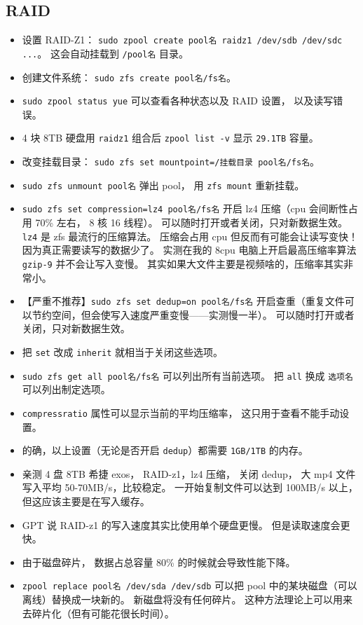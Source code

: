 \subsection{RAID}
\begin{itemize}
\item 设置 RAID-Z1： \verb|sudo zpool create pool名 raidz1 /dev/sdb /dev/sdc ...|。 这会自动挂载到 \verb|/pool名| 目录。
\item 创建文件系统： \verb|sudo zfs create pool名/fs名|。
\item \verb|sudo zpool status yue| 可以查看各种状态以及 RAID 设置， 以及读写错误。
\item 4 块 8TB 硬盘用 \verb|raidz1| 组合后 \verb|zpool list -v| 显示 \verb|29.1TB| 容量。
\item 改变挂载目录： \verb|sudo zfs set mountpoint=/挂载目录 pool名/fs名|。
\item \verb|sudo zfs unmount pool名| 弹出 pool， 用 \verb|zfs mount| 重新挂载。
\item \verb|sudo zfs set compression=lz4 pool名/fs名| 开启 lz4 压缩（cpu 会间断性占用 70\% 左右， 8 核 16 线程）。 可以随时打开或者关闭，只对新数据生效。 \verb|lz4| 是 zfs 最流行的压缩算法。 压缩会占用 cpu 但反而有可能会让读写变快！ 因为真正需要读写的数据少了。 实测在我的 8cpu 电脑上开启最高压缩率算法 \verb|gzip-9| 并不会让写入变慢。 其实如果大文件主要是视频啥的，压缩率其实非常小。
\item 【严重不推荐】\verb|sudo zfs set dedup=on pool名/fs名| 开启查重（重复文件可以节约空间，但会使写入速度严重变慢——实测慢一半）。 可以随时打开或者关闭，只对新数据生效。
\item 把 \verb|set| 改成 \verb|inherit| 就相当于关闭这些选项。
\item \verb|sudo zfs get all pool名/fs名| 可以列出所有当前选项。 把 \verb|all| 换成 \verb|选项名| 可以列出制定选项。
\item \verb|compressratio| 属性可以显示当前的平均压缩率， 这只用于查看不能手动设置。
\item 的确，以上设置（无论是否开启 \verb|dedup|）都需要 \verb|1GB/1TB| 的内存。
\item 亲测 4 盘 8TB 希捷 exos， RAID-z1，lz4 压缩， 关闭 dedup， 大 mp4 文件写入平均 50-70MB/s，比较稳定。 一开始复制文件可以达到 100MB/s 以上，但这应该主要是在写入缓存。
\item GPT 说 RAID-z1 的写入速度其实比使用单个硬盘更慢。 但是读取速度会更快。
\item 由于磁盘碎片， 数据占总容量 80\% 的时候就会导致性能下降。
\item \verb|zpool replace pool名 /dev/sda /dev/sdb| 可以把 pool 中的某块磁盘（可以离线）替换成一块新的。 新磁盘将没有任何碎片。 这种方法理论上可以用来去碎片化（但有可能花很长时间）。
\end{itemize}

